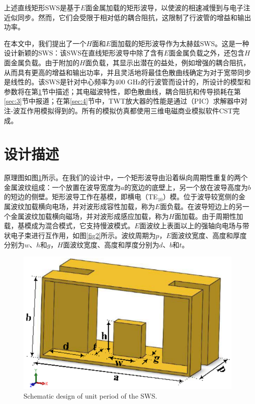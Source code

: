 \documentclass[10pt,a4paper,UTF8]{ctexart}
\begin{document}
上述直线矩形SWS是基于$ E $面金属加载的矩形波导，以使波的相速减慢到与电子注近似同步。然而，它们会受限于相对低的耦合阻抗，这限制了行波管的增益和输出功率。

在本文中，我们提出了一个$H$面和$E$面加载的矩形波导作为太赫兹SWS。这是一种设计新颖的SWS：该SWS在直线矩形波导中除了含有$E$面金属负载之外，还包含$H$面金属负载。由于附加的$H$面负载，其显示出潜在的益处，例如增强的耦合阻抗，从而具有更高的增益和输出功率，并且灵活地将最佳色散曲线确定为对于宽带同步是线性的。该SWS是针对中心频率为400 GHz的行波管而设计的，所设计的模型和参数将在第\ref{sec:2}节中描述；其电磁波特性，即色散曲线，耦合阻抗和传导损耗在第\ref{sec:3}节中报道；在第\ref{sec:4}节中，TWT放大器的性能是通过（PIC）求解器中对注-波互作用模拟得到的。所有的模拟仿真都使用三维电磁商业模拟软件CST完成。
\section{设计描述} \label{sec:2}
原理图如图\ref{fig1}所示。在我们的设计中，一个矩形波导由沿着纵向周期性重复的两个金属波纹组成：一个放置在波导宽度为$ a $的宽边的底壁上，另一个放在波导高度为$ b $的短边的侧壁。矩形波导工作在基模，即横电（TE$ _{10} $）模。位于波导较宽侧的金属波纹加载横向电场，并对波形成容性加载，称为$E$面负载。在波导短边上的另一个金属波纹加载横向磁场，并对波形成感应加载，称为$H$面加载。由于周期性加载，基模成为混合模式，它支持慢波模式。$E$面波纹上表面以上的强轴向电场与带状电子束进行互作用，如图\ref{fig2}所示。波纹周期为$ p $，$E$面波纹宽度、高度和厚度分别为$ w $、$ h $和$ g $，$H$面波纹宽度、高度和厚度分别为$ d $、$ b $和$ t $。



\begin{figure}[phtb]
	\centering
	\includegraphics[width=0.95\linewidth]{figure/fig1}
	\caption{Schematic design of unit period of the SWS.}
	\label{fig1}
\end{figure}
\end{document}
